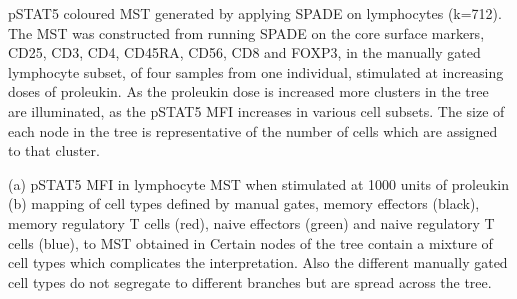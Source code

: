 
{pSTAT5 coloured \gls{MST} generated by applying \gls{SPADE} on lymphocytes (k=712).}
{
  The \gls{MST} was constructed from running \gls{SPADE} on the core surface markers,
  CD25, CD3, CD4, CD45RA, CD56, CD8 and FOXP3, in the manually gated lymphocyte subset, of four samples from one individual,
  stimulated at increasing doses of proleukin.
  As the proleukin dose is increased more clusters in the tree are illuminated, as the pSTAT5 MFI increases in various cell subsets.
  The size of each node in the tree is representative of the number of cells which are assigned to that cluster. 
}

{(a) pSTAT5 MFI in lymphocyte \gls{MST} when stimulated at 1000 units of proleukin (b) mapping of cell types defined by manual gates, memory effectors (black), memory regulatory T cells (red), naive effectors (green) and naive regulatory T cells (blue), to \gls{MST} obtained in }
{
  Certain nodes of the tree contain a mixture of cell types which complicates the interpretation.
  Also the different manually gated cell types do not segregate to different branches but are spread across the tree.
}

